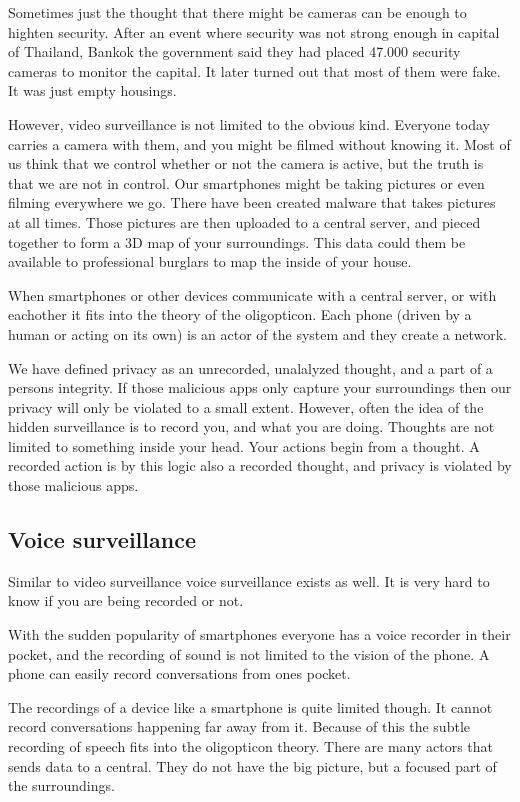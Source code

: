 Sometimes just the thought that there might be cameras can be enough to highten security. After an event where security was not strong enough in capital of Thailand, Bankok the government said they had placed 47.000 security cameras to monitor the capital. It later turned out that most of them were fake. It was just empty housings.\cite{website:bangkok-security}

However, video surveillance is not limited to the obvious kind. Everyone today carries a camera with them, and you might be filmed without knowing it. Most of us think that we control whether or not the camera is active, but the truth is that we are not in control. Our smartphones might be taking pictures or even filming everywhere we go. There have been created malware that takes pictures at all times. Those pictures are then uploaded to a central server, and pieced together to form a 3D map of your surroundings. This data could them be available to professional burglars to map the inside of your house.\cite{website:placeraider}

When smartphones or other devices communicate with a central server, or with eachother it fits into the theory of the oligopticon. Each phone (driven by a human or acting on its own) is an actor of the system and they create a network.

We have defined privacy as an unrecorded, unalalyzed thought, and a part of a persons integrity. If those malicious apps only capture your surroundings then our privacy will only be violated to a small extent. However, often the idea of the hidden surveillance is to record you, and what you are doing. Thoughts are not limited to something inside your head. Your actions begin from a thought. A recorded action is by this logic also a recorded thought, and privacy is violated by those malicious apps.

\subsection{Voice surveillance}
Similar to video surveillance voice surveillance exists as well. It is very hard to know if you are being recorded or not.

With the sudden popularity of smartphones everyone has a voice recorder in their pocket, and the recording of sound is not limited to the vision of the phone. A phone can easily record conversations from ones pocket.\cite{website:carrier-iq}

The recordings of a device like a smartphone is quite limited though. It cannot record conversations happening far away from it. Because of this the subtle recording of speech fits into the oligopticon theory. There are many actors that sends data to a central. They do not have the big picture, but a focused part of the surroundings.

